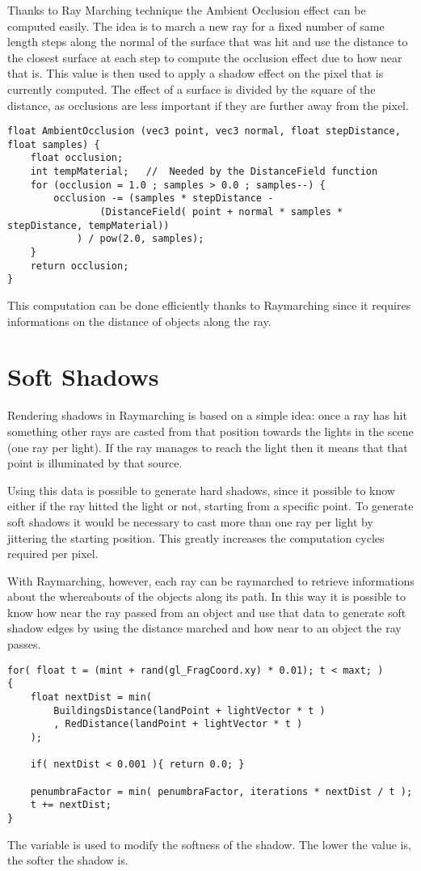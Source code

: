 Thanks to Ray Marching technique the Ambient Occlusion effect can be computed easily.
The idea is to march a new ray for a fixed number of same length steps along the normal
of the surface that was hit and use the distance to the closest surface at each step
to compute the occlusion effect due to how near that is. This value is then used to
apply a shadow effect on the pixel that is currently computed. The effect of a surface is
divided by the square of the distance, as occlusions are less important if they are further
away from the pixel.

\begin{lstlisting}
float AmbientOcclusion (vec3 point, vec3 normal, float stepDistance, float samples) {
	float occlusion;
	int tempMaterial;   //  Needed by the DistanceField function
	for (occlusion = 1.0 ; samples > 0.0 ; samples--) {
		occlusion -= (samples * stepDistance -
				(DistanceField( point + normal * samples * stepDistance, tempMaterial))
			) / pow(2.0, samples);
	}
	return occlusion;
}
\end{lstlisting}

This computation can be done efficiently thanks to Raymarching since it requires informations
on the distance of objects along the ray.

\section{Soft Shadows}

Rendering shadows in Raymarching is based on a simple idea: once a ray has hit something
other rays are casted from that position towards the lights in the scene (one ray
per light). If the ray manages to reach the light then it means that that point is
illuminated by that source.

Using this data is possible to generate hard shadows, since it possible to know either if
the ray hitted the light or not, starting from a specific point. To generate
soft shadows it would be necessary to cast more than one ray per light by jittering the starting
position. This greatly increases the computation cycles required per pixel.

With Raymarching, however, each ray can be raymarched to retrieve informations about the whereabouts 
of the objects along its path. In this way it is possible to know how near the ray
passed from an object and use that data to generate soft shadow edges by using the distance
marched and how near to an object the ray passes.

\label{lst:SoftShadow}\begin{lstlisting}
for( float t = (mint + rand(gl_FragCoord.xy) * 0.01); t < maxt; )
{
    float nextDist = min(
        BuildingsDistance(landPoint + lightVector * t )
        , RedDistance(landPoint + lightVector * t )
    );

    if( nextDist < 0.001 ){ return 0.0; }
    
    penumbraFactor = min( penumbraFactor, iterations * nextDist / t );
    t += nextDist;
}
\end{lstlisting}

The  variable is used to modify the softness of the shadow. The lower the
value is, the softer the shadow is.
